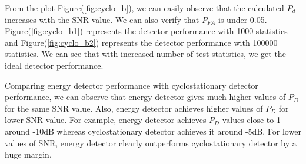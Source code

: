 \documentclass[a4 paper]{article}
\begin{document}
From the plot Figure(\ref{fig:cyclo_b}), we can easily observe that the calculated $P_{d}$ increases with the SNR value. We can also verify that $P_{FA}$ is under 0.05. Figure(\ref{fig:cyclo_b1}) represents the detector performance with 1000 statistics and Figure(\ref{fig:cyclo_b2}) represents the detector performance with 100000 statistics. We can see that with increased number of test statistics, we get the ideal detector performance. 

Comparing energy detector performance with cyclostationary detector performance, we can observe that energy detector gives much higher values of $P_{D}$ for the same SNR value. Also, energy detector achieves higher values of $P_{D}$ for lower SNR value. For example, energy detector achieves $P_{D}$ values close to 1 around -10dB whereas cyclostationary detector achieves it around -5dB. For lower values of SNR, energy detector clearly outperforms cyclostationary detector by a huge margin.
\end{document}
